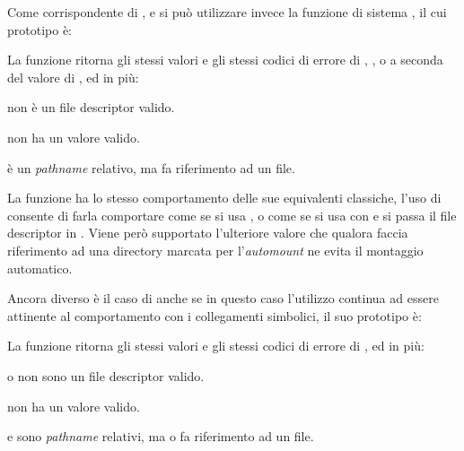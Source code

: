Come corrispondente di ,  e  si può
utilizzare invece la funzione di sistema , il cui prototipo è:

\begin{funcproto}{
}

{La funzione ritorna gli stessi valori e gli stessi codici di errore di
  , , o  a seconda del valore di
  , ed in più:
  \begin{errlist}
  \item[\errcode{EBADF}]  non è un file descriptor valido.
  \item[\errcode{EINVAL}]  non ha un valore valido.
  \item[\errcode{ENOTDIR}]  è un \textit{pathname} relativo,
    ma  fa riferimento ad un file.
  \end{errlist}
}  
\end{funcproto}

La funzione ha lo stesso comportamento delle sue equivalenti classiche, l'uso
di  consente di farla comportare come  se si usa
, o come  se si usa con
 e si passa il file descriptor in . Viene
però supportato l'ulteriore valore  che qualora
 faccia riferimento ad una directory marcata per
l'\textit{automount} ne evita il montaggio automatico.
            
Ancora diverso è il caso di  anche se in questo caso l'utilizzo
continua ad essere attinente al comportamento con i collegamenti simbolici, il
suo prototipo è:

\begin{funcproto}{
}

{La funzione ritorna gli stessi valori e gli stessi codici di errore di
  , ed in più:
  \begin{errlist}
  \item[\errcode{EBADF}]  o  non sono un file
    descriptor valido.
  \item[\errcode{EINVAL}]  non ha un valore valido.
  \item[\errcode{ENOTDIR}]  e  sono
    \textit{pathname} relativi, ma  o  fa
    riferimento ad un file.
  \end{errlist}
}  
\end{funcproto}

